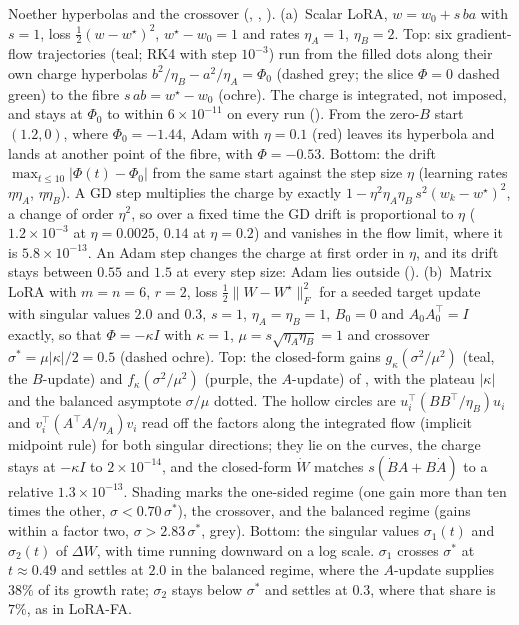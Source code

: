 Noether hyperbolas and the crossover (, , ). (a)~Scalar LoRA, $w=w_0+s\,ba$ with $s=1$, loss $\tfrac12(w-w^\star)^2$, $w^\star-w_0=1$ and rates $\eta_A=1$, $\eta_B=2$. Top: six gradient-flow trajectories (teal; RK4 with step $10^{-3}$) run from the filled dots along their own charge hyperbolas $b^2/\eta_B-a^2/\eta_A=\Phi_0$ (dashed grey; the slice $\Phi=0$ dashed green) to the fibre $s\,ab=w^\star-w_0$ (ochre). The charge is integrated, not imposed, and stays at $\Phi_0$ to within $6\times10^{-11}$ on every run (). From the zero-$B$ start $(1.2,0)$, where $\Phi_0=-1.44$, Adam with $\eta=0.1$ (red) leaves its hyperbola and lands at another point of the fibre, with $\Phi=-0.53$. Bottom: the drift $\max_{t\le10}\lvert\Phi(t)-\Phi_0\rvert$ from the same start against the step size $\eta$ (learning rates $\eta\eta_A$, $\eta\eta_B$). A GD step multiplies the charge by exactly $1-\eta^2\eta_A\eta_B\,s^2(w_k-w^\star)^2$, a change of order $\eta^2$, so over a fixed time the GD drift is proportional to $\eta$ ($1.2\times10^{-3}$ at $\eta=0.0025$, $0.14$ at $\eta=0.2$) and vanishes in the flow limit, where it is $5.8\times10^{-13}$. An Adam step changes the charge at first order in $\eta$, and its drift stays between $0.55$ and $1.5$ at every step size: Adam lies outside  (). (b)~Matrix LoRA with $m=n=6$, $r=2$, loss $\tfrac12\lVert W-W^\star\rVert_F^2$ for a seeded target update with singular values $2.0$ and $0.3$, $s=1$, $\eta_A=\eta_B=1$, $B_0=0$ and $A_0A_0^\top=I$ exactly, so that $\Phi=-\kappa I$ with $\kappa=1$, $\mu=s\sqrt{\eta_A\eta_B}=1$ and crossover $\sigma^*=\mu\lvert\kappa\rvert/2=0.5$ (dashed ochre). Top: the closed-form gains $g_\kappa(\sigma^2/\mu^2)$ (teal, the $B$-update) and $f_\kappa(\sigma^2/\mu^2)$ (purple, the $A$-update) of , with the plateau $\lvert\kappa\rvert$ and the balanced asymptote $\sigma/\mu$ dotted. The hollow circles are $u_i^\top(BB^\top/\eta_B)u_i$ and $v_i^\top(A^\top A/\eta_A)v_i$ read off the factors along the integrated flow (implicit midpoint rule) for both singular directions; they lie on the curves, the charge stays at $-\kappa I$ to $2\times10^{-14}$, and the closed-form $\dot W$ matches $s(\dot BA+B\dot A)$ to a relative $1.3\times10^{-13}$. Shading marks the one-sided regime (one gain more than ten times the other, $\sigma<0.70\,\sigma^*$), the crossover, and the balanced regime (gains within a factor two, $\sigma>2.83\,\sigma^*$, grey). Bottom: the singular values $\sigma_1(t)$ and $\sigma_2(t)$ of $\Delta W$, with time running downward on a log scale. $\sigma_1$ crosses $\sigma^*$ at $t\approx0.49$ and settles at $2.0$ in the balanced regime, where the $A$-update supplies $38\%$ of its growth rate; $\sigma_2$ stays below $\sigma^*$ and settles at $0.3$, where that share is $7\%$, as in LoRA-FA.
